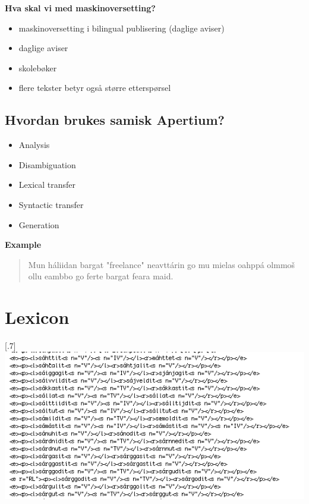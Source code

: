 \documentclass[a4paper,english,12pt]{article}
\begin{document}
\begin{spacing}{1.0}
\textbf{Hva skal vi med maskinoversetting?}
\begin{itemize}
\item maskinoversetting i bilingual publisering (daglige aviser)
\item daglige aviser
\item skolebøker
\item flere tekster betyr også større etterspørsel
\end{itemize}

\subsection{Hvordan brukes samisk Apertium?}

\begin{itemize}
\item Analysis
\item Disambiguation
\item Lexical transfer
\item Syntactic transfer
\item Generation
\end{itemize}

\textbf{Example}
\begin{quote}
Mun háliidan bargat "freelance" neavttárin go mu mielas oahppá olmmoš ollu eambbo go ferte bargat feara maid.
\end{quote}



\section{Lexicon}

\scalebox{.7}[.7]{\includegraphics{bidix.png}}



\end{spacing}
\end{document}
